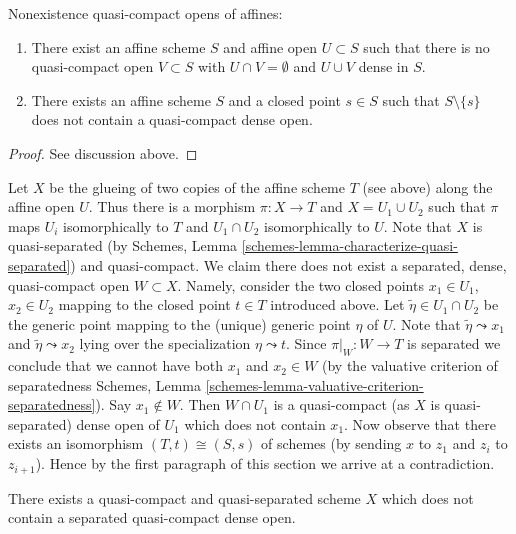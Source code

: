 \begin{lemma}
\label{lemma-complement-of-affine-does-not-contain-qc-dense-open}
Nonexistence quasi-compact opens of affines:
\begin{enumerate}
\item There exist an affine scheme $S$ and affine open $U \subset S$
such that there is no quasi-compact open $V \subset S$ with
$U \cap V = \emptyset$ and $U \cup V$ dense in $S$.
\item There exists an affine scheme $S$ and a closed point $s \in S$ such that
$S \setminus \{s\}$ does not contain a quasi-compact dense open.
\end{enumerate}
\end{lemma}

\begin{proof}
See discussion above.
\end{proof}

\noindent
Let $X$ be the glueing of two copies of the affine scheme $T$ (see above)
along the affine open $U$. Thus there is a morphism $\pi : X \to T$ and
$X = U_1 \cup U_2$ such that $\pi$ maps $U_i$ isomorphically to $T$ and
$U_1 \cap U_2$ isomorphically to $U$. Note that $X$ is quasi-separated
(by Schemes, Lemma \ref{schemes-lemma-characterize-quasi-separated})
and quasi-compact. We claim there does not exist a separated, dense,
quasi-compact open $W \subset X$. Namely, consider the two closed
points $x_1 \in U_1$, $x_2 \in U_2$ mapping to the closed point $t \in T$
introduced above. Let $\tilde \eta \in U_1 \cap U_2$ be the generic point
mapping to the (unique) generic point $\eta$ of $U$.
Note that $\tilde\eta \leadsto x_1$ and $\tilde\eta \leadsto x_2$
lying over the specialization $\eta \leadsto t$.
Since $\pi|_W : W \to T$ is separated we conclude that we cannot have both
$x_1$ and $x_2 \in W$ (by the valuative criterion of separatedness
Schemes, Lemma \ref{schemes-lemma-valuative-criterion-separatedness}).
Say $x_1 \not \in W$. Then $W \cap U_1$ is a quasi-compact (as $X$
is quasi-separated) dense open of $U_1$ which does not contain $x_1$.
Now observe that there exists an isomorphism $(T, t) \cong (S, s)$
of schemes (by sending $x$ to $z_1$ and $z_i$ to $z_{i + 1}$).
Hence by the first paragraph of this section we arrive at a contradiction.

\begin{lemma}
\label{lemma-no-dense-separated-quasi-compact-open-in-qcqs}
There exists a quasi-compact and quasi-separated scheme $X$ which does
not contain a separated quasi-compact dense open.
\end{lemma}

